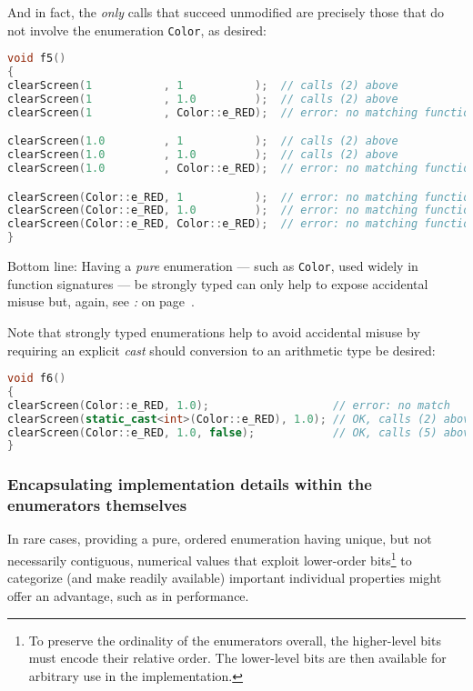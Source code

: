 \noindent And in fact, the \emph{only} calls that succeed unmodified are precisely
those that do not involve the enumeration \texttt{Color}, as desired:

\begin{lstlisting}[language=C++]
void f5()
{
clearScreen(1           , 1           );  // calls (2) above
clearScreen(1           , 1.0         );  // calls (2) above
clearScreen(1           , Color::e_RED);  // error: no matching function

clearScreen(1.0         , 1           );  // calls (2) above
clearScreen(1.0         , 1.0         );  // calls (2) above
clearScreen(1.0         , Color::e_RED);  // error: no matching function

clearScreen(Color::e_RED, 1           );  // error: no matching function
clearScreen(Color::e_RED, 1.0         );  // error: no matching function
clearScreen(Color::e_RED, Color::e_RED);  // error: no matching function
}
\end{lstlisting}

\noindent Bottom line: Having a \emph{pure} enumeration --- such as
\texttt{Color}, used widely in function signatures --- be strongly typed
can only help to expose accidental misuse but, again, see
\textit{: } on page~\pageref{strong-typing-of-an-enum-class-can-be-counterproductive}.

Note that strongly typed enumerations help to avoid accidental misuse by
requiring an explicit \emph{cast} should conversion to an arithmetic
type be desired:

\begin{lstlisting}[language=C++]
void f6()
{
clearScreen(Color::e_RED, 1.0);                   // error: no match
clearScreen(static_cast<int>(Color::e_RED), 1.0); // OK, calls (2) above
clearScreen(Color::e_RED, 1.0, false);            // OK, calls (5) above
}
\end{lstlisting}


\subsubsection[Encapsulating implementation details within the enumerators themselves]{Encapsulating implementation details within the enumerators themselves}\label{encapsulating-implementation-details-within-the-enumerators-themselves}

In rare cases, providing a pure, ordered enumeration having unique, but
not necessarily contiguous, numerical values that exploit lower-order
bits{\cprotect\footnote{To preserve the ordinality of the enumerators
overall, the higher-level bits must encode their relative order. The
lower-level bits are then available for arbitrary use in the
implementation.}} to categorize (and make readily available) important
individual properties might offer an advantage, such as in performance.

